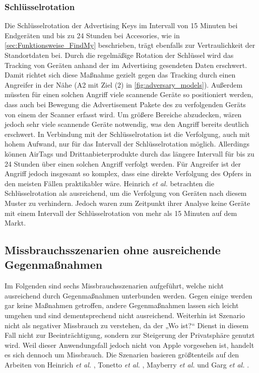 \subsubsection{Schlüsselrotation}
Die Schlüsselrotation der Advertising Keys im Intervall von 15 Minuten bei Endgeräten und bis zu 24 Stunden bei Accesories, wie in \autoref{sec:Funktionsweise_FindMy} beschrieben, trägt ebenfalls zur Vertraulichkeit der Standortdaten bei.
Durch die regelmäßige Rotation der Schlüssel wird das Tracking von Geräten anhand der im Advertising gesendeten Daten erschwert.
Damit richtet sich diese Maßnahme gezielt gegen das Tracking durch einen Angreifer in der Nähe (A2 mit Ziel (2) in \autoref{fig:adversary_models}).
Außerdem müssten für einen solchen Angriff viele scannende Geräte so positioniert werden, dass auch bei Bewegung die Advertisement Pakete des zu verfolgenden Geräts von einem der Scanner erfasst wird.
Um größere Bereiche abzudecken, wären jedoch sehr viele scannende Geräte notwendig, was den Angriff bereits deutlich erschwert.
In Verbindung mit der Schlüsselrotation ist die Verfolgung, auch mit hohem Aufwand, nur für das Intervall der Schlüsselrotation möglich.
Allerdings können AirTags und Drittanbieterprodukte durch das längere Intervall für bis zu 24 Stunden über einen solchen Angriff verfolgt werden.
Für Angreifer ist der Angriff jedoch insgesamt so komplex, dass eine direkte Verfolgung des Opfers in den meisten Fällen praktikabler wäre.
Heinrich \textit{et al.} \cite{Heinrich_FindMy} betrachten die Schlüsselrotation als ausreichend, um die Verfolgung von Geräten nach diesem Muster zu verhindern.
Jedoch waren zum Zeitpunkt ihrer Analyse keine Geräte mit einem Intervall der Schlüsselrotation von mehr als 15 Minuten auf dem Markt.


\subsection{Missbrauchsszenarien ohne ausreichende Gegenmaßnahmen}
\label{sec:szenarien}

Im Folgenden sind sechs Missbrauchsszenarien aufgeführt, welche nicht ausreichend durch Gegenmaßnahmen unterbunden werden.
Gegen einige werden gar keine Maßnahmen getroffen, andere Gegenmaßnahmen lassen sich leicht umgehen und sind dementsprechend nicht ausreichend.
Weiterhin ist Szenario  nicht als negativer Missbrauch zu verstehen, da der „Wo ist?“ Dienst in diesem Fall nicht zur Beeinträchtigung, sondern zur Steigerung der Privatsphäre genutzt wird.
Weil dieser Anwendungsfall jedoch nicht von Apple vorgesehen ist, handelt es sich dennoch um Missbrauch.
Die Szenarien basieren größtenteils auf den Arbeiten von Heinrich \textit{et al.} \cite{Heinrich_FindMy}, Tonetto \textit{et al.} \cite{Tonetto_FindMy}, Mayberry \textit{et al.} \cite{Mayberry_Tracking} und Garg \textit{et al.} \cite{Garg_Secure_Tracker}.

